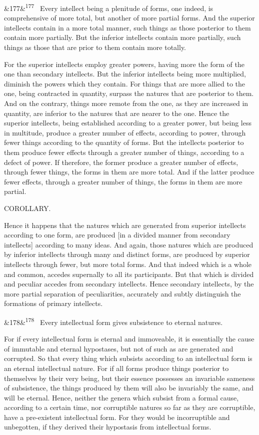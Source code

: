 \documentclass[12pt]{article}
\newcommand{\para}[1][]{\par\noindent\ifx&#1&\else\textsuperscript{\footnotesize #1}~\fi}
\begin{document}
\para[177] Every intellect being a plenitude of forms, one indeed, is comprehensive of more total, but another of more partial forms. And the superior intellects contain in a more total manner, such things as those posterior to them contain more partially. But the inferior intellects contain more partially, such things as those that are prior to them contain more totally.

For the superior intellects employ greater powers, having more the form of the one than secondary intellects. But the inferior intellects being more multiplied, diminish the powers which they contain. For things that are more allied to the one, being contracted in quantity, surpass the natures that are posterior to them. And on the contrary, things more remote from the one, as they are increased in quantity, are inferior to the natures that are nearer to the one. Hence the superior intellects, being established according to a greater power, but being less in multitude, produce a greater number of effects, according to power, through fewer things according to the quantity of forms. But the intellects posterior to them produce fewer effects through a greater number of things, according to a defect of power. If therefore, the former produce a greater number of effects, through fewer things, the forms in them are more total. And if the latter produce fewer effects, through a greater number of things, the forms in them are more partial.

COROLLARY.

Hence it happens that the natures which are generated from superior intellects according to one form, are produced [in a divided manner from secondary intellects] according to many ideas. And again, those natures which are produced by inferior intellects through many and distinct forms, are produced by superior intellects through fewer, but more total forms. And that indeed which is a whole and common, accedes supernally to all its participants. But that which is divided and peculiar accedes from secondary intellects. Hence secondary intellects, by the more partial separation of peculiarities, accurately and subtly distinguish the formations of primary intellects.

\para[178] Every intellectual form gives subsistence to eternal natures.

For if every intellectual form is eternal and immoveable, it is essentially the cause of immutable and eternal hypostases, but not of such as are generated and corrupted. So that every thing which subsists according to an intellectual form is an eternal intellectual nature. For if all forms produce things posterior to themselves by their very being, but their essence possesses an invariable sameness of subsistence, the things produced by them will also be invariably the same, and will be eternal. Hence, neither the genera which subsist from a formal cause, according to a certain time, nor corruptible natures so far as they are corruptible, have a pre-existent intellectual form. For they would be incorruptible and unbegotten, if they derived their hypostasis from intellectual forms.
\end{document}
